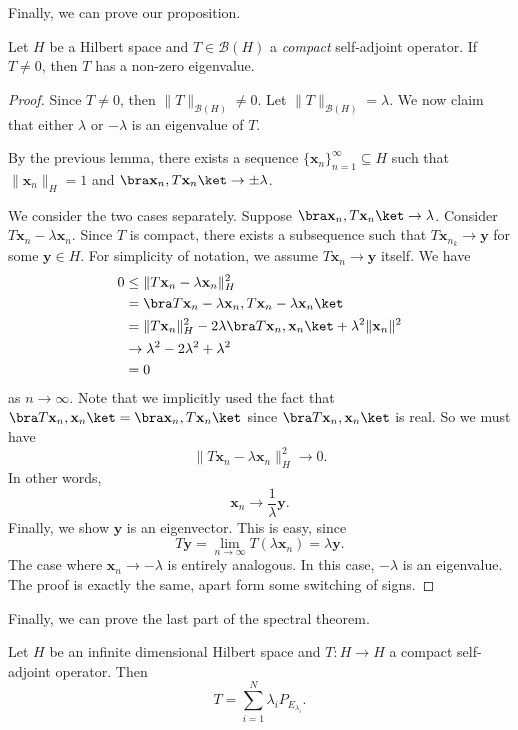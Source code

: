 \documentclass[a4paper]{article}
\begin{document}
Finally, we can prove our proposition.
\begin{prop}
  Let $H$ be a Hilbert space and $T \in \mathcal{B}(H)$ a \emph{compact} self-adjoint operator. If $T \not= 0$, then $T$ has a non-zero eigenvalue.
\end{prop}

\begin{proof}
  Since $T \not= 0$, then $\|T\|_{\mathcal{B}(H)} \not= 0$. Let $\|T\|_{\mathcal{B}(H)} = \lambda$. We now claim that either $\lambda$ or $-\lambda$ is an eigenvalue of $T$.

  By the previous lemma, there exists a sequence $\{\mathbf{x}_n\}_{n = 1}^\infty \subseteq H$ such that $\|\mathbf{x}_n\|_H = 1$ and $\bra \mathbf{x}_n, T \mathbf{x}_n\ket \to \pm \lambda$.

  We consider the two cases separately. Suppose $\bra \mathbf{x}_n, T \mathbf{x}_n \ket \to \lambda$. Consider $T \mathbf{x}_n - \lambda \mathbf{x}_n$. Since $T$ is compact, there exists a subsequence such that $T \mathbf{x}_{n_k} \to \mathbf{y}$ for some $\mathbf{y} \in H$. For simplicity of notation, we assume $T \mathbf{x}_n \to \mathbf{y}$ itself. We have
  \begin{align*}
    0 &\leq \|T \mathbf{x}_n - \lambda \mathbf{x}_n \|_H^2\\
    &= \bra T\mathbf{x}_n - \lambda \mathbf{x}_n, T \mathbf{x}_n - \lambda \mathbf{x}_n\ket\\
    &= \|T \mathbf{x}_n\|_H^2 - 2\lambda \bra T \mathbf{x}_n, \mathbf{x}_n\ket + \lambda^2 \|\mathbf{x}_n\|^2\\
    &\to \lambda^2 - 2 \lambda^2 + \lambda^2\\
    &= 0
  \end{align*}
  as $n \to \infty$. Note that we implicitly used the fact that $\bra T \mathbf{x}_n, \mathbf{x}_n\ket = \bra \mathbf{x}_n, T \mathbf{x}_n\ket$ since $\bra T \mathbf{x}_n, \mathbf{x}_n\ket$ is real. So we must have
  \[
    \|T \mathbf{x}_n - \lambda \mathbf{x}_n\|_H^2 \to 0.
  \]
  In other words,
  \[
    \mathbf{x}_n \to \frac{1}{\lambda} \mathbf{y}.
  \]
  Finally, we show $\mathbf{y}$ is an eigenvector. This is easy, since
  \[
    T \mathbf{y} = \lim_{n \to \infty} T(\lambda \mathbf{x}_n) = \lambda \mathbf{y}.
  \]
  The case where $\mathbf{x}_n \to -\lambda$ is entirely analogous. In this case, $-\lambda$ is an eigenvalue. The proof is exactly the same, apart form some switching of signs.
\end{proof}

Finally, we can prove the last part of the spectral theorem.
\begin{prop}
  Let $H$ be an infinite dimensional Hilbert space and $T: H \to H$ a compact self-adjoint operator. Then
  \[
    T = \sum_{i = 1}^N \lambda_i P_{E_{\lambda_i}}.
  \]
\end{prop}
\end{document}

